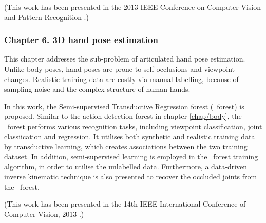 (This work has been presented in the 2013 IEEE Conference on Computer Vision and Pattern Recognition \cite{Yu2013}.)  

\subsubsection*{Chapter 6. 3D hand pose estimation} 

This chapter addresses the sub-problem of articulated hand pose estimation.  Unlike body poses, hand poses are prone to self-occlusions and viewpoint changes. Realistic training data are costly via manual labelling, because of sampling noise and the complex structure of human hands. 

In this work, the Semi-supervised Transductive Regression forest (\STR\ forest) is proposed. Similar to the action detection forest in chapter \ref{chap/body}, the \STR\ forest performs various recognition tasks, including viewpoint classification, joint classiication and regression. It utilises both synthetic and realistic training data by transductive learning, which creates associations between the two training dataset. In addition, semi-supervised learning is employed in the \STR\ forest training algorithm, in order to utilise the unlabelled data.
Furthermore, a data-driven inverse kinematic technique is also presented to recover the occluded joints from the \STR\ forest.

(This work has been presented in the 14th IEEE International Conference of Computer Vision, 2013 \cite{Tang2013}.)

